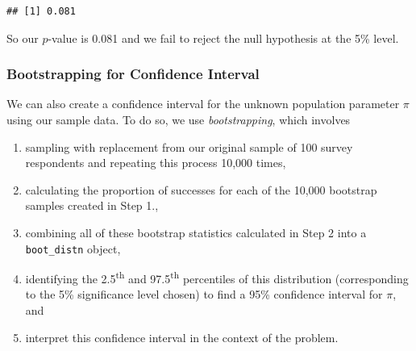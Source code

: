 \documentclass[]{tufte-book}
\newenvironment{Shaded}{\begin{snugshade}}{\end{snugshade}}
\newcommand{\KeywordTok}[1]{\textcolor[rgb]{0.13,0.29,0.53}{\textbf{{#1}}}}
\newcommand{\DataTypeTok}[1]{\textcolor[rgb]{0.13,0.29,0.53}{{#1}}}
\newcommand{\DecValTok}[1]{\textcolor[rgb]{0.00,0.00,0.81}{{#1}}}
\newcommand{\FloatTok}[1]{\textcolor[rgb]{0.00,0.00,0.81}{{#1}}}
\newcommand{\StringTok}[1]{\textcolor[rgb]{0.31,0.60,0.02}{{#1}}}
\newcommand{\OtherTok}[1]{\textcolor[rgb]{0.56,0.35,0.01}{{#1}}}
\newcommand{\NormalTok}[1]{{#1}}
\providecommand{\tightlist}{%
  \setlength{\itemsep}{0pt}\setlength{\parskip}{0pt}}
\theoremstyle{definition}
\theoremstyle{definition}
\theoremstyle{remark}
\begin{document}
\begin{Shaded}
\end{Shaded}

\begin{verbatim}
## [1] 0.081
\end{verbatim}

So our \(p\)-value is 0.081 and we fail to reject the null hypothesis at
the 5\% level.

\subsubsection{Bootstrapping for Confidence
Interval}\label{bootstrapping-for-confidence-interval-1}

We can also create a confidence interval for the unknown population
parameter \(\pi\) using our sample data. To do so, we use
\emph{bootstrapping}, which involves

\begin{enumerate}
\def\labelenumi{\arabic{enumi}.}
\tightlist
\item
  sampling with replacement from our original sample of 100 survey
  respondents and repeating this process 10,000 times,
\item
  calculating the proportion of successes for each of the 10,000
  bootstrap samples created in Step 1.,
\item
  combining all of these bootstrap statistics calculated in Step 2 into
  a \texttt{boot\_distn} object,
\item
  identifying the 2.5\textsuperscript{th} and 97.5\textsuperscript{th}
  percentiles of this distribution (corresponding to the 5\%
  significance level chosen) to find a 95\% confidence interval for
  \(\pi\), and
\item
  interpret this confidence interval in the context of the problem.
\end{enumerate}

\begin{Shaded}
\end{Shaded}
\end{document}
